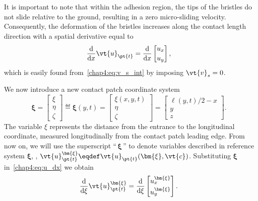It is important to note that within the adhesion region, the tips of the bristles do not slide relative to the ground, resulting in a zero micro-sliding velocity. Consequently, the deformation of the bristles increases along the contact length direction with a spatial derivative equal to
%
\begin{equation}
  \dfrac{\mathrm{d}}{\mathrm{d}x}\vt{u}_{\pt{t}} =
  \dfrac{\mathrm{d}}{\mathrm{d}x}
  \begin{bmatrix}
    u_x \\[0.2em]
    u_y
  \end{bmatrix},
  \label{chap4:eq:u_dx}
\end{equation}
%
which is easily found from~\eqref{chap4:eq:v_s_int} by imposing $\vt{v}_s = 0$.

We now introduce a new contact patch coordinate system
%
\begin{equation}
  \bm{\xi} =
  \begin{bmatrix}
    \xi \\[0.2em]
    \eta \\[0.2em]
    \zeta
  \end{bmatrix}
  \eqdef \bm{\xi}(y,t) =
  \begin{bmatrix}
    \xi(x,y,t) \\[0.2em]
    \eta \\[0.2em]
    \zeta
  \end{bmatrix}
  =
  \begin{bmatrix}
    \ell(y,t)/2-x \\[0.2em]
    y \\[0.2em]
    z
  \end{bmatrix}.
\end{equation}
%
The variable $\xi$ represents the distance from the entrance to the longitudinal coordinate, measured longitudinally from the contact patch leading edge. From now on, we will use the superscript ``$\,\bm{\xi}\,$'' to denote variables described in reference system $\bm{\xi}$, \eg{}, $\vt{u}_{\pt{t}}^{\bm{\xi}} \eqdef \vt{u}_{\pt{t}}(\bm{\xi},\vt{c})$. Substituting $\bm{\xi}$ in~\eqref{chap4:eq:u_dx} we obtain
%
\begin{equation}
  \dfrac{\mathrm{d}}{\mathrm{d}\xi}\vt{u}_{\pt{t}}^{\bm{\xi}} =
  \dfrac{\mathrm{d}}{\mathrm{d}\xi}
  \begin{bmatrix}
    u_{x}^{\bm{\xi}} \\[0.2em]
    u_{y}^{\bm{\xi}}
  \end{bmatrix}.
  \label{chap4:eq:u_dxi}
\end{equation}
